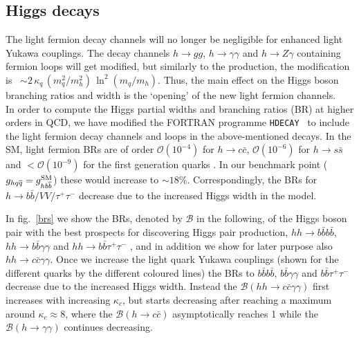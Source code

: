 \subsection{Higgs decays \label{sec:Hdecay}}
The light fermion decay channels will no longer be negligible for enhanced light Yukawa couplings. The decay channels $ h \to gg$, $h \to \gamma \gamma$  and $h \to Z \gamma$ containing fermion loops will get modified, but similarly to the production, the modification is ~$\sim 2\,\kappa_q\,(m_q^2/m_h^2) \,\ln^2(m_q/m_h)$. Thus, the main effect on the Higgs boson branching ratios and width is the `opening' of the new light fermion channels. \\ In order to compute the Higgs partial widths and branching ratios (BR) at higher orders in QCD, we have modified the FORTRAN programme \texttt{HDECAY}~\cite{Djouadi:1997yw,Djouadi:2018xqq} to include the light fermion decay channels and loops in the above-mentioned decays. In the SM, light fermion BRs are of order $\mathcal{O}(10^{-4})$ for $ h \to c \bar{c} $,  $\mathcal{O}(10^{-6})$ for $ h \to s \bar{s} $  and  $<\mathcal{O}(10^{-9})$ for the first generation quarks \cite{deFlorian:2016spz}. In our benchmark point ($g_{hq \overline q} = g_{h b \overline b}^{\mathrm{SM}}$) these would increase to $ \sim 18 \%$. Correspondingly, the BRs for  $ h \to b \bar b/VV/\tau^+\tau^-$ decrease due to the increased Higgs width in the model.
\par
In fig.~\ref{brs} we show the BRs, denoted by $\mathcal{B}$ in the following,  of the Higgs boson pair with the best prospects for discovering Higgs pair production, $hh\to b\bar{b}b\bar{b}$, $hh\to b\bar{b}\gamma\gamma$ and $hh\to b\bar{b}\tau^+\tau^-$ \cite{Aad:2019uzh}, and in addition we show for later purpose also  $hh\to c\bar{c}\gamma\gamma$. Once we increase the light quark Yukawa couplings (shown for the different quarks by the different coloured lines) the BRs to $b\bar{b}b\bar{b}$, $b\bar{b}\gamma\gamma$ and $b\bar{b}\tau^+\tau^-$ decrease due to the increased Higgs width. Instead the $\mathcal{B}(hh\to c\bar{c}\gamma\gamma)$ first increases with increasing $\kappa_c$, but starts decreasing after reaching a maximum around $\kappa_c\approx 8$, where the $\mathcal{B}(h\to c\bar{c})$ asymptotically reaches 1 while the $\mathcal{B}(h\to \gamma \gamma)$ continues decreasing.

